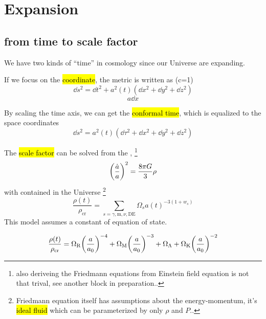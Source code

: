 
\section{Expansion}

\subsection{from time to scale factor}

We have two kinds of ``time'' in cosmology since our Universe are expanding. 

If we focus on the \hl{coordinate}, the metric is written as (c=1)
\begin{equation}
    \dd s^2 = \dd t^2 + a^2(t) (\dd x^2 + \dd y^2 + \dd z^2)
\end{equation}
\begin{equation}
    a\dd{x}
\end{equation}


By scaling the time axis, we can get the \hl{conformal time}, which is equalized to the space coordinates
\begin{equation}
    \dd s^2 = a^2(t) (\dd \tau^2 + \dd x^2 + \dd y^2 + \dd z^2)
\end{equation}

The \hl{scale factor} can be solved from the , 
\footnote{also deriveing the Friedmann equations from Einstein field equation is not that trival, see another block in preparation..}
\begin{equation}
    {\qty(\frac{\dot{a}}{a})}^2 = \frac{8\pi G}{3} \rho
\end{equation}
with  contained in the Universe 
\footnote{Friedmann equation itself has assumptions about the energy-momentum, it's \hl{ideal fluid} which can be parameterized by only $\rho$ and $P$..}
\begin{equation}
    \frac{\rho(t)}{\rho_{\mathrm{cr}}} = \sum_{s=\gamma, \mathrm{m}, \nu, \mathrm{DE}} \Omega_{s} {a(t)}^{-3 (1 + w_{s})} 
\end{equation}
This model assumes a constant of equation of state. 


\begin{equation}
    \frac{\rho(t)}{\rho_{\mathrm{cr}}} = \Omega_{\mathrm{R}} {\qty(\frac{a}{a_0})}^{-4} + \Omega_{\mathrm{M}} {\qty(\frac{a}{a_0})}^{-3} + \Omega_\Lambda + \Omega_{\mathrm{K}} {\qty(\frac{a}{a_0})}^{-2}
\end{equation}



